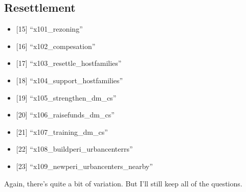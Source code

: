 \documentclass[12pt,]{article}
\providecommand{\tightlist}{%
\setlength{\itemsep}{0pt}\setlength{\parskip}{0pt}}
\begin{document}
\hypertarget{resettlement}{%
\subsection{Resettlement}\label{resettlement}}

\begin{itemize}
\tightlist
\item
  {[}15{]} ``x101\_rezoning''\\
\item
  {[}16{]} ``x102\_compesation''\\
\item
  {[}17{]} ``x103\_resettle\_hostfamilies''\\
\item
  {[}18{]} ``x104\_support\_hostfamilies''\\
\item
  {[}19{]} ``x105\_strengthen\_dm\_cs''\\
\item
  {[}20{]} ``x106\_raisefunds\_dm\_cs''\\
\item
  {[}21{]} ``x107\_training\_dm\_cs''\\
\item
  {[}22{]} ``x108\_buildperi\_urbancenterrs''\\
\item
  {[}23{]} ``x109\_newperi\_urbancenters\_nearby''
\end{itemize}

Again, there's quite a bit of variation. But I'll still keep all of the
questions.
\end{document}
